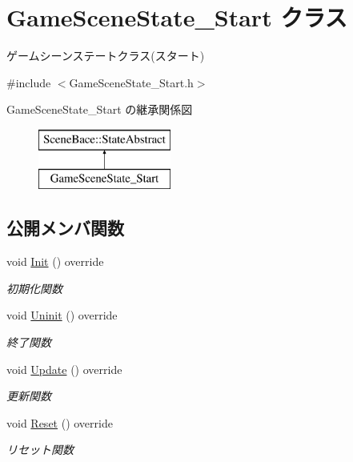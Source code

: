 \hypertarget{class_game_scene_state___start}{}\section{Game\+Scene\+State\+\_\+\+Start クラス}
\label{class_game_scene_state___start}


ゲームシーンステートクラス(スタート)  




{\ttfamily \#include $<$Game\+Scene\+State\+\_\+\+Start.\+h$>$}

Game\+Scene\+State\+\_\+\+Start の継承関係図\begin{figure}[H]
\begin{center}
\leavevmode
\includegraphics[height=2.000000cm]{class_game_scene_state___start}
\end{center}
\end{figure}
\subsection*{公開メンバ関数}
\begin{DoxyCompactItemize}
\item 
void \mbox{\hyperlink{class_game_scene_state___start_ae921c57f349fbb2f00a197d40a3404b7}{Init}} () override
\begin{DoxyCompactList}\small\item\em 初期化関数 \end{DoxyCompactList}\item 
void \mbox{\hyperlink{class_game_scene_state___start_a636df8b7ac0173b044b0efc2927fb83b}{Uninit}} () override
\begin{DoxyCompactList}\small\item\em 終了関数 \end{DoxyCompactList}\item 
void \mbox{\hyperlink{class_game_scene_state___start_ae11bb8d8ea9eae4fea2a9acf33dd1c8b}{Update}} () override
\begin{DoxyCompactList}\small\item\em 更新関数 \end{DoxyCompactList}\item 
void \mbox{\hyperlink{class_game_scene_state___start_a59270f7b65613f580864ed8ea3056179}{Reset}} () override
\begin{DoxyCompactList}\small\item\em リセット関数 \end{DoxyCompactList}\end{DoxyCompactItemize}
